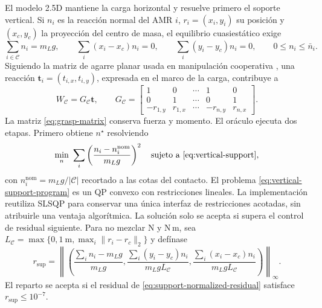 \documentclass[12pt,a4paper]{article}
\begin{document}
El modelo 2.5D mantiene la carga horizontal y resuelve primero el soporte
vertical. Si $n_i$ es la reacción normal del AMR $i$, $r_i=(x_i,y_i)$ su
posición y $(x_c,y_c)$ la proyección del centro de masa, el equilibrio
cuasiestático exige
\begin{equation}
\sum_{i\in\mathcal C} n_i=m_Lg,
\qquad
\sum_i(x_i-x_c)n_i=0,
\qquad
\sum_i(y_i-y_c)n_i=0,
\qquad 0\leq n_i\leq\bar n_i.
\label{eq:vertical-support}
\end{equation}
Siguiendo la matriz de agarre planar usada en manipulación cooperativa
\parencite{nakamura1989dynamics,yoshikawa1993coordinated}, una reacción
$\mathbf t_i=(t_{i,x},t_{i,y})$, expresada en el marco de la carga, contribuye a
\begin{equation}
W_{\mathcal C}=G_{\mathcal C}\mathbf t,
\qquad
G_{\mathcal C}=\begin{bmatrix}
1&0&\cdots&1&0\\
0&1&\cdots&0&1\\
-r_{1,y}&r_{1,x}&\cdots&-r_{n,y}&r_{n,x}
\end{bmatrix}.
\label{eq:grasp-matrix}
\end{equation}
La matriz \eqref{eq:grasp-matrix} conserva fuerza y momento. El oráculo ejecuta dos etapas. Primero obtiene $n^\star$ resolviendo
\begin{equation}
\min_n\ \sum_i\left(\frac{n_i-n_i^{\mathrm{nom}}}{m_Lg}\right)^2
\quad\text{sujeto a \eqref{eq:vertical-support}},
\label{eq:vertical-support-program}
\end{equation}
con $n_i^{\mathrm{nom}}=m_Lg/|\mathcal C|$ recortado a las cotas del contacto.
El problema \eqref{eq:vertical-support-program} es un QP convexo con
restricciones lineales. La implementación reutiliza SLSQP para conservar una
única interfaz de restricciones acotadas, sin atribuirle una ventaja algorítmica.
La solución solo se acepta si supera el control de residual siguiente. Para no
mezclar N y N\,m, sea
$L_{\mathcal C}=\max\{0{,}1\ \mathrm m,\max_i\|r_i-r_c\|_2\}$ y defínase
\begin{equation}
r_{\mathrm{sup}}=\left\|\left(
\frac{\sum_i n_i-m_Lg}{m_Lg},
\frac{\sum_i(y_i-y_c)n_i}{m_LgL_{\mathcal C}},
\frac{\sum_i(x_i-x_c)n_i}{m_LgL_{\mathcal C}}
\right)\right\|_\infty .
\label{eq:support-normalized-residual}
\end{equation}
El reparto se acepta si el residual de \eqref{eq:support-normalized-residual}
satisface $r_{\mathrm{sup}}\leq10^{-7}$.
\end{document}
